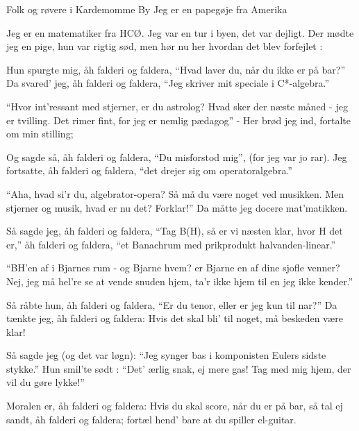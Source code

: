 {Folk og røvere i Kardemomme By}
{Jeg er en papegøje fra Amerika}
{
Jeg er en matematiker fra HCØ.
Jeg var en tur i byen, det var dejligt.
Der mødte jeg en pige, hun var rigtig sød,
men hør nu her hvordan det blev forfejlet :

Hun spurgte mig, åh falderi og faldera,
``Hvad laver du, når du ikke er på bar?''
Da svared' jeg, åh falderi og faldera,
``Jeg skriver mit speciale i C*-algebra.''

``Hvor int'ressant med stjerner, er du astrolog?
Hvad sker der næste måned - jeg er tvilling.
Det rimer fint, for jeg er nemlig pædagog''
- Her brød jeg ind, fortalte om min stilling;

Og sagde så, åh falderi og faldera,
``Du misforstod mig'', (for jeg var jo rar).
Jeg fortsatte, åh falderi og faldera,
``det drejer sig om operatoralgebra.''

``Aha, hvad si'r du, algebrator-opera?
Så må du være noget ved musikken.
Men stjerner og musik, hvad er nu det? Forklar!''
Da måtte jeg docere mat'matikken.

Så sagde jeg, åh falderi og faldera,
``Tag B(H), så er vi næsten klar,
hvor H det er,'' åh falderi og faldera,
``et Banachrum med prikprodukt halvanden-linear.''


``BH'en af i Bjarnes rum - og Bjarne hvem?
er Bjarne en af dine sjofle venner?
Nej, jeg må hel're se at vende snuden hjem,
ta'r ikke hjem til en jeg ikke kender.''

Så råbte hun, åh falderi og faldera,
``Er du tenor, eller er jeg kun til nar?''
Da tænkte jeg, åh falderi og faldera:
Hvis det skal bli' til noget, må beskeden være klar!

Så sagde jeg (og det var løgn): ``Jeg synger bas
i komponisten Eulers sidste stykke.''
Hun smil'te sødt : ``Det' ærlig snak, ej mere gas!
Tag med mig hjem, der vil du gøre lykke!''

Moralen er, åh falderi og faldera:
Hvis du skal score, når du er på bar,
så tal ej sandt, åh falderi og faldera;
fortæl hend' bare at du spiller el-guitar.
}
